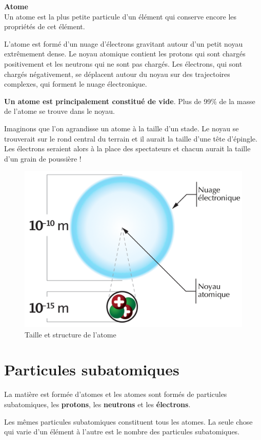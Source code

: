 \documentclass[
  11pt,
  a4paper,
  openany]{book}
\begin{document}
\begin{tcolorbox}
\textbf{Atome}\\
Un atome est la plus petite particule d'un élément qui conserve encore les propriétés de cet élément.

\end{tcolorbox}

L'atome est formé d'un nuage d'électrons gravitant autour d'un petit noyau extrêmement dense. Le noyau atomique contient les protons qui sont chargés positivement et les neutrons qui ne sont pas chargés. Les électrons, qui sont chargés négativement, se déplacent autour du noyau sur des trajectoires complexes, qui forment le nuage électronique.

\textbf{Un atome est principalement constitué de vide}. Plus de 99\% de la masse de l'atome se trouve dans le noyau.

Imaginons que l'on agrandisse un atome à la taille d'un stade. Le noyau se trouverait sur le rond central du terrain et il aurait la taille d'une tête d'épingle. Les électrons seraient alors à la place des spectateurs et chacun aurait la taille d'un grain de poussière !

\begin{figure}

{\centering \includegraphics[width=0.33\linewidth]{images/ordre-grandeur-atome} 

}

\caption{Taille et structure de l'atome}\label{fig:ordre-grandeur-atome}
\end{figure}

\hypertarget{particules-subatomiques}{%
\section{Particules subatomiques}\label{particules-subatomiques}}

La matière est formée d'atomes et les atomes sont formés de particules subatomiques, les \textbf{protons}, les \textbf{neutrons} et les \textbf{électrons}.

Les mêmes particules subatomiques constituent tous les atomes. La seule chose qui varie d'un élément à l'autre est le nombre des particules subatomiques.
\end{document}
